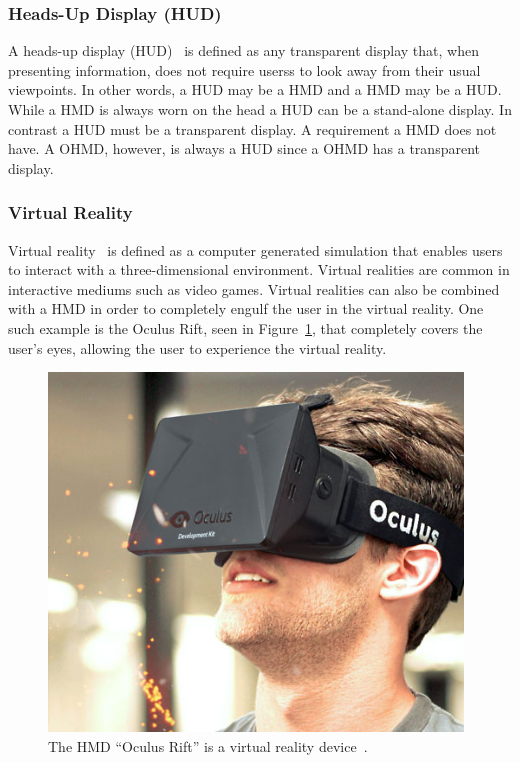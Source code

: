 \subsubsection{Heads-Up Display (HUD)}
\label{subsubsec:hud}
A heads-up display (HUD)~\cite{hudWiki} is defined as any transparent display that, when presenting information, does not require userss to look away from their usual viewpoints. In other words, a HUD may be a HMD and a HMD may be a HUD. While a HMD is always worn on the head a HUD can be a stand-alone display. In contrast a HUD must be a transparent display. A requirement a HMD does not have. A OHMD, however, is always a HUD since a OHMD has a transparent display.

\subsubsection{Virtual Reality}
\label{subsubsec:vr}
Virtual reality~\cite{virtualRealityDef} is defined as a computer generated simulation that enables users to interact with a three-dimensional environment. Virtual realities are common in interactive mediums such as video games. Virtual realities can also be combined with a HMD in order to completely engulf the user in the virtual reality. One such example is the Oculus Rift, seen in Figure~\ref{OculusRift}, that completely covers the user's eyes, allowing the user to experience the virtual reality.

	\begin{figure}[ht!]
		\centering
		\includegraphics[width=110mm]{images/OculusRift}
		\caption{The HMD ``Oculus Rift'' is a virtual reality device~\cite{ImagesOculusRift}.}
		\label{OculusRift}
	\end{figure}

